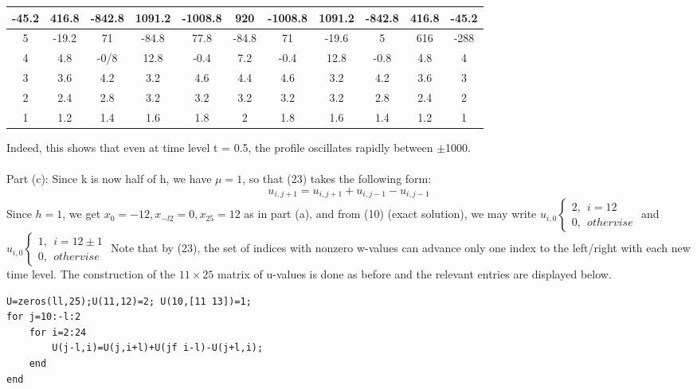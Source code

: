 \documentclass[../main.tex]{subfiles}
\begin{document}
\begin{table}[!ht]
    \centering
    \begin{tabular}{|c|c|c|c|c|c|c|c|c|c|c|}
    \hline
        -45.2 & 416.8 & -842.8 & 1091.2 & -1008.8 & 920 & -1008.8 & 1091.2 & -842.8 & 416.8 & -45.2 \\ \hline
        5 & -19.2 & 71 & -84.8 & 77.8 & -84.8 & 71 & -19.6 & 5 & 616 &-288\\ \hline
        4 & 4.8 & -0/8 & 12.8 & -0.4 & 7.2 & -0.4 & 12.8 & -0.8 & 4.8 & 4  \\ \hline
        3 & 3.6 & 4.2 & 3.2 & 4.6 & 4.4 & 4.6 & 3.2 & 4.2 & 3.6 & 3  \\ \hline
        2 & 2.4 & 2.8 & 3.2 & 3.2 & 3.2 & 3.2 & 3.2 & 2.8 & 2.4 & 2 \\ \hline
        1 & 1.2 & 1.4 & 1.6 & 1.8 & 2 & 1.8 & 1.6 & 1.4 & 1.2 & 1 \\ \hline
    \end{tabular}
\end{table}
Indeed, this shows that even at time level t = 0.5, the profile oscillates rapidly 
between $\pm$1000.
\\
\\
Part (c): Since k is now half of h, we have $\mu = 1$, so that (23) takes the following form:  
$$u_{i,j+1}=u_{i,j+1}+u_{i,j-1}-u_{i,j-1}$$
Since $h = 1$, we get $x_0 = -12, x_{-l2} = 0, x_{25} = 12$ as in part (a), and from (10) (exact solution), we may write
$u_{i,0}
	\begin{cases}
		2, ~~i=12 \\
		0, ~~othervise
	\end{cases}$ and
$u_{i,0}
	\begin{cases}
		1, ~~i=12\pm 1 \\
		0, ~~othervise
	\end{cases}$
Note that  by (23), the set of indices with nonzero w-values can advance only one index to the left/right with each new time level. The construction of the $11 \times 25$ matrix of u-values is done as before and the relevant entries are displayed below. 
\begin{lstlisting}[numbers=none,frame=none]
U=zeros(ll,25);U(11,12)=2; U(10,[11 13])=1; 
for j=10:-l:2 
	for i=2:24 
		U(j-l,i)=U(j,i+l)+U(jf i-l)-U(j+l,i); 
	end 
end 
\end{lstlisting}
\end{document}
